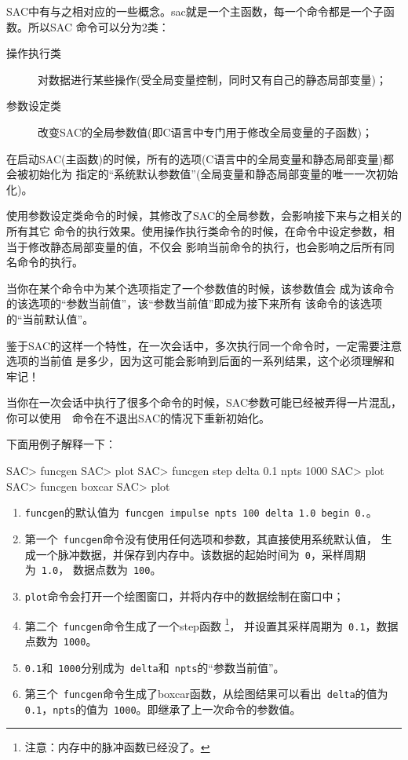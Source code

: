 SAC中有与之相对应的一些概念。sac就是一个主函数，每一个命令都是一个子函数。所以SAC
命令可以分为2类：
\begin{description}
\item[操作执行类] 对数据进行某些操作(受全局变量控制，同时又有自己的静态局部变量)；
\item[参数设定类] 改变SAC的全局参数值(即C语言中专门用于修改全局变量的子函数)；
\end{description}

在启动SAC(主函数)的时候，所有的选项(C语言中的全局变量和静态局部变量)都会被初始化为
指定的``系统默认参数值''(全局变量和静态局部变量的唯一一次初始化)。

使用参数设定类命令的时候，其修改了SAC的全局参数，会影响接下来与之相关的所有其它
命令的执行效果。使用操作执行类命令的时候，在命令中设定参数，相当于修改静态局部变量的值，不仅会
影响当前命令的执行，也会影响之后所有同名命令的执行。

当你在某个命令中为某个选项指定了一个参数值的时候，该参数值会
成为该命令的该选项的``参数当前值''，该``参数当前值''即成为接下来所有
该命令的该选项的``当前默认值''。

鉴于SAC的这样一个特性，在一次会话中，多次执行同一个命令时，一定需要注意选项的当前值
是多少，因为这可能会影响到后面的一系列结果，这个必须理解和牢记！

\begin{Tips}
当你在一次会话中执行了很多个命令的时候，SAC参数可能已经被弄得一片混乱，
你可以使用~~命令在不退出SAC的情况下重新初始化。
\end{Tips}

下面用例子解释一下：
\begin{SACCode}
SAC> funcgen
SAC> plot
SAC> funcgen step delta 0.1 npts 1000
SAC> plot
SAC> funcgen boxcar
SAC> plot
\end{SACCode}

\begin{enumerate}
\item \verb+funcgen+的默认值为~\verb+funcgen impulse npts 100 delta 1.0 begin 0.+。
\item 第一个~\verb+funcgen+命令没有使用任何选项和参数，其直接使用系统默认值，
    生成一个脉冲数据，并保存到内存中。该数据的起始时间为~\verb+0+，采样周期为~\verb+1.0+，
    数据点数为~\verb+100+。
\item \verb+plot+命令会打开一个绘图窗口，并将内存中的数据绘制在窗口中；
\item 第二个~\verb+funcgen+命令生成了一个step函数
    \footnote{注意：内存中的脉冲函数已经没了。}，
    并设置其采样周期为~\verb+0.1+，数据点数为~\verb+1000+。
\item \verb+0.1+和~\verb+1000+分别成为~\verb+delta+和~\verb+npts+的``参数当前值''。
\item 第三个~\verb+funcgen+命令生成了boxcar函数，从绘图结果可以看出~\verb+delta+的值为
    \verb+0.1+，\verb+npts+的值为~\verb+1000+。即继承了上一次命令的参数值。
\end{enumerate}
